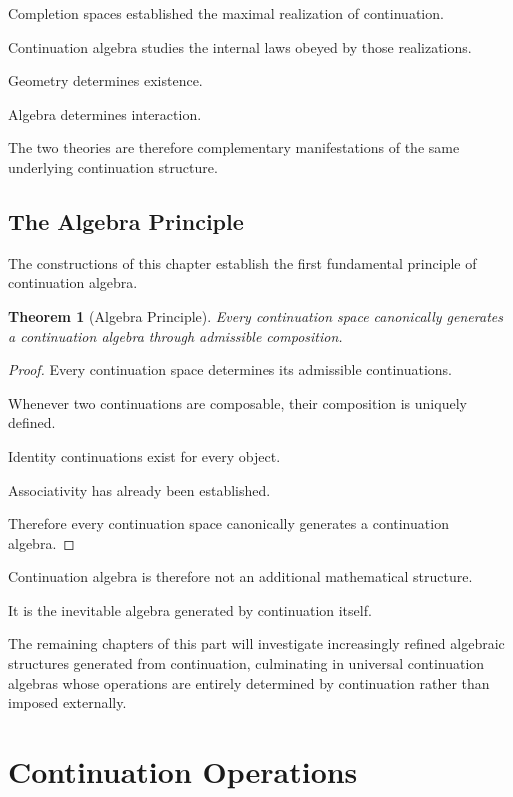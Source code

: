 \documentclass[13pt,openany]{book}
\theoremstyle{plain}
\newtheorem{theorem}{Theorem}[chapter]
\theoremstyle{definition}
\begin{document}
Completion spaces established the maximal realization of continuation.

Continuation algebra studies the internal laws obeyed by those realizations.

Geometry determines existence.

Algebra determines interaction.

The two theories are therefore complementary manifestations of the same
underlying continuation structure.

\section{The Algebra Principle}

The constructions of this chapter establish the first fundamental principle of
continuation algebra.

\begin{theorem}[Algebra Principle]
Every continuation space canonically generates a continuation algebra through
admissible composition.
\end{theorem}

\begin{proof}
Every continuation space determines its admissible continuations.

Whenever two continuations are composable, their composition is uniquely
defined.

Identity continuations exist for every object.

Associativity has already been established.

Therefore every continuation space canonically generates a continuation
algebra.
\end{proof}

Continuation algebra is therefore not an additional mathematical structure.

It is the inevitable algebra generated by continuation itself.

The remaining chapters of this part will investigate increasingly refined
algebraic structures generated from continuation, culminating in universal
continuation algebras whose operations are entirely determined by continuation
rather than imposed externally.


\chapter{Continuation Operations}
\end{document}
